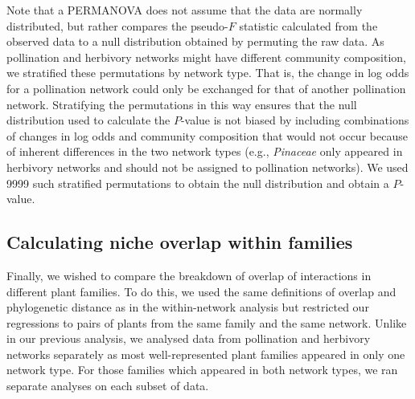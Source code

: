 \documentclass[12pt]{article}
\begin{document}
\begin{spacing}{1.5}
  Note that a PERMANOVA does not assume that the data are 
  normally distributed, but rather compares the pseudo-$F$ 
  statistic calculated from the observed data to a null 
  distribution obtained by permuting the raw data. As 
  pollination and herbivory networks might have different
  community composition, we stratified these permutations
  by network type. That is, the change in log odds for a pollination
  network could only be exchanged for that of another pollination
  network. Stratifying the permutations in this way ensures that 
  the null distribution used to calculate the $P$-value is not 
  biased by including combinations of changes in log odds and 
  community composition that would not occur because of inherent 
  differences in the two network types (e.g., \emph{Pinaceae} 
  only appeared in herbivory networks and should not be assigned 
  to pollination networks). We used 9999 such stratified permutations 
  to obtain the null distribution and obtain a $P$-value.



\subsection*{Calculating niche overlap within families}


  Finally, we wished to compare the breakdown of overlap of interactions in
  different plant families. To do this, we used the same definitions of 
  overlap and phylogenetic distance as in the within-network analysis but 
  restricted our regressions to pairs of plants from the same family and 
  the same network. Unlike in our previous analysis, we analysed data from 
  pollination and herbivory networks separately as most well-represented 
  plant families appeared in only one network type. For those families 
  which appeared in both network types, we ran separate analyses on each 
  subset of data.



\end{spacing}
\end{document}
